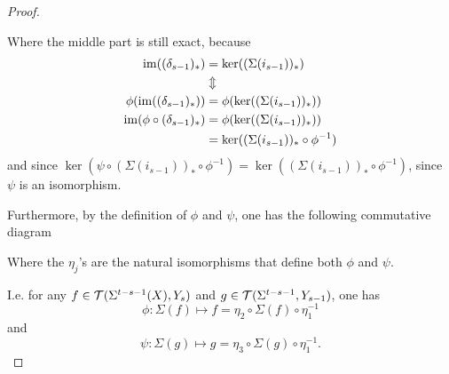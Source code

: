 \begin{proof}
\begin{center}
    \end{center}
    Where the middle part is still exact, because
    \begin{align*}
        \operatorname{im}((\delta_{s-1})_*) &= \ker((\Sigma(i_{s-1}))_*) \\
        &\Updownarrow \\
        \phi(\operatorname{im}((\delta_{s-1})_*)) &= \phi(\ker((\Sigma(i_{s-1}))_*)) \\
        \operatorname{im}(\phi \circ (\delta_{s-1})_*) &= \phi(\ker((\Sigma(i_{s-1}))_*)) \\
        &= \ker((\Sigma(i_{s-1}))_* \circ \phi^{-1})
    \end{align*}
    and since \( \ker(\psi \circ (\Sigma(i_{s-1}))_* \circ \phi^{-1}) = \ker((\Sigma(i_{s-1}))_* \circ \phi^{-1}) \), since \( \psi \) is an isomorphism.

    Furthermore, by the definition of \( \phi \) and \( \psi \), one has the following commutative diagram
    \begin{center}
    \end{center}
    Where the \( \eta_j \)'s are the natural isomorphisms that define both \( \phi \) and \( \psi \).
    
    I.e. for any \( f \in {\mathcal{T}}(\Sigma^{t - s - 1}(X), Y_s) \) and \( g \in {\mathcal{T}}(\Sigma^{t - s - 1}, Y_{s - 1}) \), one has
    \[
        \phi: \Sigma( f ) \mapsto f = \eta_2 \circ \Sigma( f ) \circ \eta_1^{-1}
    \]
    and
    \[
        \psi: \Sigma( g ) \mapsto g = \eta_3 \circ \Sigma( g ) \circ \eta_1^{-1}.
    \]


\end{proof}
